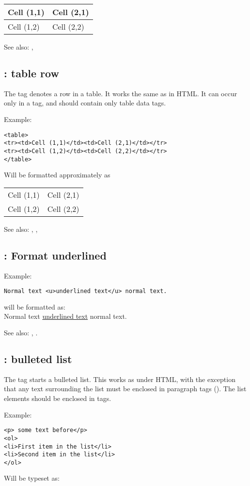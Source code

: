 \begin{tabular}{ll}
Cell (1,1) & Cell (2,1) \\ \hline
Cell (1,2) & Cell (2,2)
\end{tabular}
 
See also: , 

\subsection{ : table row}
\label{tag:tr}
The  tag denotes a row in a table. It works the same as in HTML.
It can occur only in a  tag, and should contain only 
table data tags. 

Example:
\begin{verbatim}
<table>
<tr><td>Cell (1,1)</td><td>Cell (2,1)</td></tr>
<tr><td>Cell (1,2)</td><td>Cell (2,2)</td></tr>
</table>
\end{verbatim}
Will be formatted approximately as

\begin{tabular}{ll}
Cell (1,1) & Cell (2,1) \\
Cell (1,2) & Cell (2,2)
\end{tabular}

See also: , , 

\subsection{ : Format underlined}
\label{tag:u}

Example:
\begin{verbatim}
Normal text <u>underlined text</u> normal text.
\end{verbatim}
will be formatted as:\\
Normal text \underline{underlined text} normal text.

See also: , .

\subsection{ : bulleted list}
\label{tag:ul}
The  tag starts a bulleted list. This works as under HTML, with the
exception that any text surrounding the list must be enclosed in paragraph
tags (). The list elements should be enclosed in  tags.

Example:
\begin{verbatim}
<p> some text before</p>
<ol>
<li>First item in the list</li>
<li>Second item in the list</li>
</ol>
\end{verbatim}
Will be typeset as:

